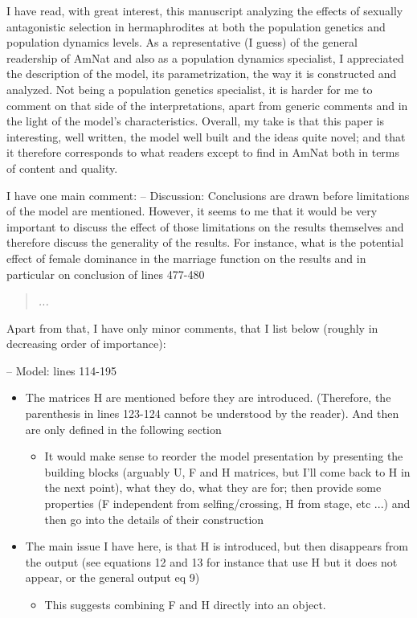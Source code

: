 \documentclass[11pt]{article}
\begin{document}
I have read, with great interest, this manuscript analyzing the effects of sexually antagonistic selection in hermaphrodites at both the population genetics and population dynamics levels. As a representative (I guess) of the general readership of AmNat and also as a population dynamics specialist, I appreciated the description of the model, its parametrization, the way it is constructed and analyzed. Not being a population genetics specialist, it is harder for me to comment on that side of the interpretations, apart from generic comments and in the light of the model’s characteristics. Overall, my take is that this paper is interesting, well written, the model well built and the ideas quite novel; and that it therefore corresponds to what readers except to find in AmNat both in terms of content and quality.

I have one main comment:
-- Discussion: Conclusions are drawn before limitations of the model are mentioned. However, it seems to me that it would be very important to discuss the effect of those limitations on the results themselves and therefore discuss the generality of the results. For instance, what is the potential effect of female dominance in the marriage function on the results and in particular on conclusion of lines 477-480

\begin{quote}
	{\itshape ...}
\end{quote}

\noindent Apart from that, I have only minor comments, that I list below (roughly in decreasing order of importance):
\bigskip 

\noindent -- Model: lines 114-195
\begin{itemize}
	\item The matrices H are mentioned before they are introduced. (Therefore, the parenthesis in lines 123-124 cannot be understood by the reader). And then are only defined in the following section	
	\begin{itemize}
		\item It would make sense to reorder the model presentation by presenting the building blocks (arguably U, F and H matrices, but I'll come back to H in the next point), what they do, what they are for; then provide some properties (F independent from selfing/crossing, H from stage, etc ...) and then go into the details of their construction
	\end{itemize}
	\item The main issue I have here, is that H is introduced, but then disappears from the output (see equations 12 and 13 for instance that use H but it does not appear, or the general output eq 9)
	\begin{itemize}
		\item This suggests combining F and H directly into an object.
	\end{itemize}
\end{itemize}
\end{document}
